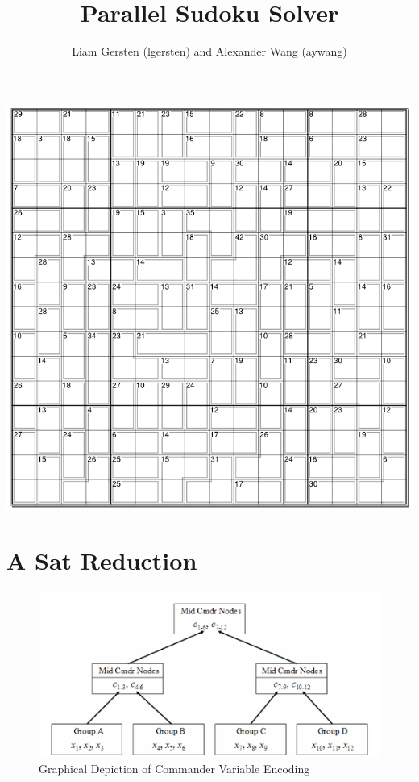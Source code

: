 \documentclass{article}
\title{Parallel Sudoku Solver}
\author{Liam Gersten (lgersten) and Alexander Wang (aywang)}
\begin{document}
\maketitle

\centering
\includegraphics[width=1.0\linewidth]{images/sudoku_example.png}
\newpage

\section{A Sat Reduction}
\begin{figure}[!htb]
    \centering
    \includegraphics[width=1\linewidth]{images/comm1.png}
    \caption{Graphical Depiction of Commander Variable Encoding}
\end{figure}
\end{document}
